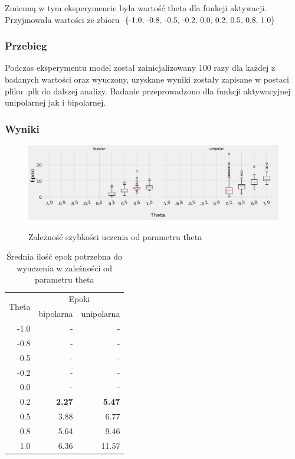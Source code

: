 \documentclass{article}
\begin{document}
Zmienną w tym eksperymencie była wartość theta dla funkcji aktywacji. Przyjmowała wartości ze zbioru \(\{$-1.0, -0.8, -0.5, -0.2, 0.0, 0.2, 0.5, 0.8, 1.0$\}\)
\subsubsection*{Przebieg}

Podczas eksperymentu model został zainicjalizowany 100 razy dla każdej z badanych wartości oraz wyuczony, uzyskane wyniki zostały zapisane w postaci pliku .plk do dalszej analizy. Badanie przeprowadzono dla funkcji aktywacyjnej unipolarnej jak i bipolarnej.

\subsubsection*{Wyniki}
\begin{figure}[!h]
	\centering
	\caption{Zależność szybkości uczenia od parametru theta}
	\includegraphics[width=\textwidth]{per_theta.png}
	\label{fig:res11}
\end{figure}

\begin{table}[!h]
	\caption{Średnia ilość epok potrzebna do wyuczenia w zależności od parametru theta}
	\label{tabela-res-11}
	\centering
	\begin{tabular}{rrr}
		\toprule
		\multirow{2}{*}{Theta}   & \multicolumn{2}{c}{Epoki} \\
		     & bipolarna     & unipolarna    \\
		\midrule
		-1.0 & -             & -             \\
		-0.8 & -             & -             \\
		-0.5 & -             & -             \\
		-0.2 & -             & -             \\
		0.0  & -             & -             \\
		0.2  & \textbf{2.27} & \textbf{5.47} \\
		0.5  & 3.88          & 6.77          \\
		0.8  & 5.64          & 9.46          \\
		1.0  & 6.36          & 11.57         \\
		\bottomrule
	\end{tabular}
\end{table}
\end{document}
